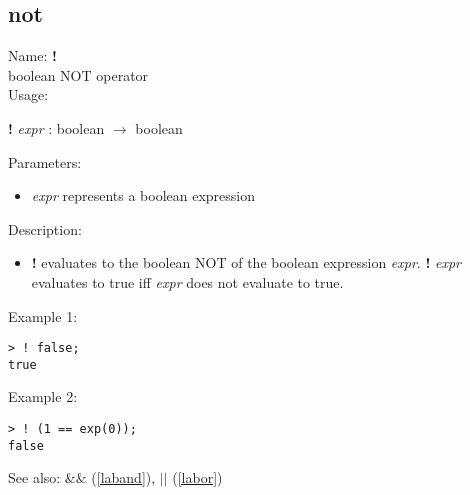 \subsection{not}
\label{labnot}
\noindent Name: \textbf{!}\\
boolean NOT operator\\
\noindent Usage: 
\begin{center}
\textbf{!} \emph{expr} : \textsf{boolean} $\rightarrow$ \textsf{boolean}
\end{center}
Parameters: 
\begin{itemize}
\item \emph{expr} represents a boolean expression
\end{itemize}
\noindent Description: \begin{itemize}

\item \textbf{!} evaluates to the boolean NOT of the boolean expression
   \emph{expr}. \textbf{!} \emph{expr} evaluates to true iff \emph{expr} does not evaluate
   to true.
\end{itemize}
\noindent Example 1: 
\begin{center}\begin{minipage}{15cm}\begin{Verbatim}[frame=single]
> ! false;
true
\end{Verbatim}
\end{minipage}\end{center}
\noindent Example 2: 
\begin{center}\begin{minipage}{15cm}\begin{Verbatim}[frame=single]
> ! (1 == exp(0));
false
\end{Verbatim}
\end{minipage}\end{center}
See also: \textbf{$\&\&$} (\ref{laband}), \textbf{$||$} (\ref{labor})
